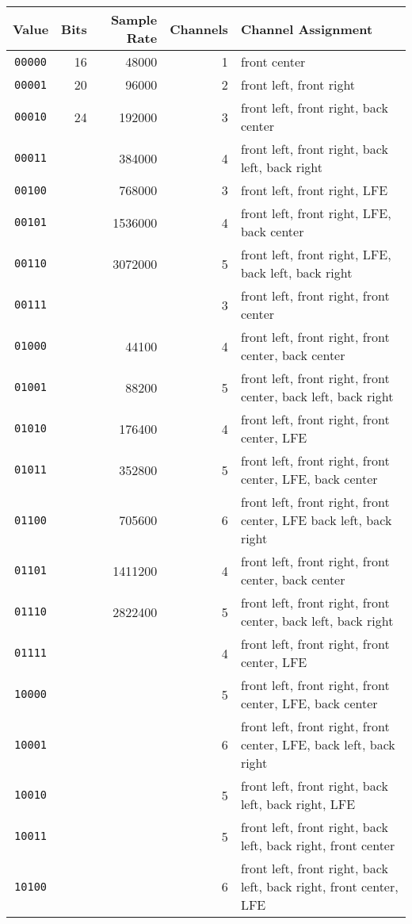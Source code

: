 \begin{tiny}
\begin{tabular}{|c|r|r|r|l|}
\hline
Value & Bits & Sample Rate & Channels & Channel Assignment \\
\hline
\texttt{00000} & 16 & 48000 & 1 & front center \\
\texttt{00001} & 20 & 96000 & 2 & front left, front right\\
\texttt{00010} & 24 & 192000 & 3 & front left, front right, back center \\
\texttt{00011} & & 384000 & 4 & front left, front right, back left, back right\\
\texttt{00100} & & 768000 & 3 & front left, front right, LFE \\
\texttt{00101} & & 1536000 & 4 & front left, front right, LFE, back center \\
\texttt{00110} & & 3072000 & 5 & front left, front right, LFE, back left, back right \\
\texttt{00111} & & & 3 & front left, front right, front center \\
\texttt{01000} & & 44100 & 4 & front left, front right, front center, back center \\
\texttt{01001} & & 88200 & 5 & front left, front right, front center, back left, back right \\
\texttt{01010} & & 176400 & 4 & front left, front right, front center, LFE\\
\texttt{01011} & & 352800 & 5 & front left, front right, front center, LFE, back center \\
\texttt{01100} & & 705600 & 6 & front left, front right, front center, LFE back left, back right \\
\texttt{01101} & & 1411200 & 4 & front left, front right, front center, back center \\
\texttt{01110} & & 2822400 & 5 & front left, front right, front center, back left, back right \\
\texttt{01111} & & & 4 & front left, front right, front center, LFE \\
\texttt{10000} & & & 5 & front left, front right, front center, LFE, back center \\
\texttt{10001} & & & 6 & front left, front right, front center, LFE, back left, back right \\
\texttt{10010} & & & 5 & front left, front right, back left, back right, LFE \\
\texttt{10011} & & & 5 & front left, front right, back left, back right, front center \\
\texttt{10100} & & & 6 & front left, front right, back left, back right, front center, LFE \\
\hline
\end{tabular}
\end{tiny}

